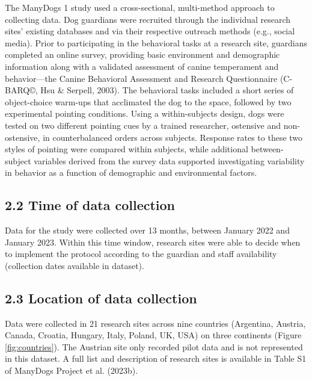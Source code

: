 \documentclass[
  pub,floatsintext]{apa6}
\begin{document}
The ManyDogs 1 study used a cross-sectional, multi-method approach to collecting data. Dog guardians were recruited through the individual research sites' existing databases and via their respective outreach methods (e.g., social media). Prior to participating in the behavioral tasks at a research site, guardians completed an online survey, providing basic environment and demographic information along with a validated assessment of canine temperament and behavior---the Canine Behavioral Assessment and Research Questionnaire (C-BARQ©, Hsu \& Serpell, 2003). The behavioral tasks included a short series of object-choice warm-ups that acclimated the dog to the space, followed by two experimental pointing conditions. Using a within-subjects design, dogs were tested on two different pointing cues by a trained researcher, ostensive and non-ostensive, in counterbalanced orders across subjects. Response rates to these two styles of pointing were compared within subjects, while additional between-subject variables derived from the survey data supported investigating variability in behavior as a function of demographic and environmental factors.

\hypertarget{time-of-data-collection}{%
\subsection{2.2 Time of data collection}\label{time-of-data-collection}}

Data for the study were collected over 13 months, between January 2022 and January 2023. Within this time window, research sites were able to decide when to implement the protocol according to the guardian and staff availability (collection dates available in dataset).

\hypertarget{location-of-data-collection}{%
\subsection{2.3 Location of data collection}\label{location-of-data-collection}}

Data were collected in 21 research sites across nine countries (Argentina, Austria, Canada, Croatia, Hungary, Italy, Poland, UK, USA) on three continents (Figure \ref{fig:countries}). The Austrian site only recorded pilot data and is not represented in this dataset. A full list and description of research sites is available in Table S1 of ManyDogs Project et al. (2023b).
\end{document}
